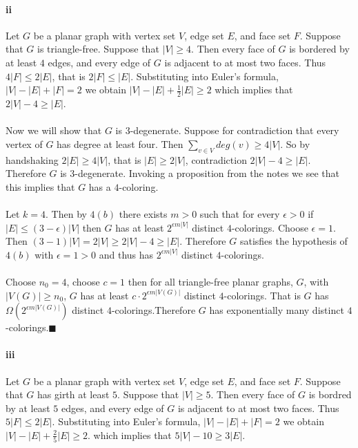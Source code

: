 \documentclass[letterpaper,12pt,oneside,onecolumn]{report}
\begin{document}
\paragraph{ii}
Let $G$ be a planar graph with vertex set $V$, edge set $E$, and face set $F$. Suppose that $G$ is triangle-free. Suppose that $|V| \geq 4$. Then every face of $G$ is bordered by at least $4$ edges, and every edge of $G$ is adjacent to at most two faces. Thus $4|F| \leq 2|E|$, that is $2|F| \leq |E|$. Substituting into Euler's formula, $|V| - |E| + |F| = 2$ we obtain $|V| - |E| + \frac{1}{2} |E| \geq 2$ which implies that $2|V| - 4 \geq |E|$.
\paragraph{}
Now we will show that $G$ is $3$-degenerate. Suppose for contradiction that every vertex of $G$ has degree at least four. Then $\sum_{v\in V} deg(v) \geq 4|V|$. So by handshaking $2|E| \geq 4|V|$, that is $|E| \geq 2|V|$, contradiction $2|V| - 4 \geq |E|$. Therefore $G$ is $3$-degenerate. Invoking a proposition from the notes we see that this implies that $G$ has a $4$-coloring.
\paragraph{}
Let $k = 4$. Then by $4(b)$ there exists $m > 0$ such that for every $\epsilon > 0 $ if $|E| \leq (3 - \epsilon)|V|$ then $G$ has at least $2^{\epsilon m |V|}$ distinct $4$-colorings. Choose $\epsilon = 1$. Then $(3 - 1)|V| = 2|V| \geq 2|V| - 4 \geq |E|$. Therefore $G$ satisfies the hypothesis of $4(b)$ with $\epsilon = 1 > 0$ and thus has $2^{\epsilon m |V|}$ distinct $4$-colorings.
\paragraph{}
Choose $n_0 = 4$, choose $c = 1$ then for all triangle-free planar graphs, $G$, with $|V(G)| \geq n_0$, $G$ has at least $c \cdot 2^{\epsilon m |V(G)|}$ distinct $4$-colorings. That is $G$ has $\Omega(2^{\epsilon m |V(G)|})$ distinct $4$-colorings.Therefore $G$ has exponentially many distinct $4$-colorings.$\blacksquare$
\paragraph{iii}
Let $G$ be a planar graph with vertex set $V$, edge set $E$, and face set $F$. Suppose that $G$ has girth at least $5$. Suppose that $|V| \geq 5$. Then every face of $G$ is bordred by at least $5$ edges, and every edge of $G$ is adjacent to at most two faces. Thus $5|F| \leq 2|E|$. Substituting into Euler's formula, $|V| - |E| + |F| = 2$ we obtain $|V| - |E| + \frac{2}{5}|E| \geq 2$. which implies that $5|V| - 10 \geq 3|E|$. 
\end{document}
